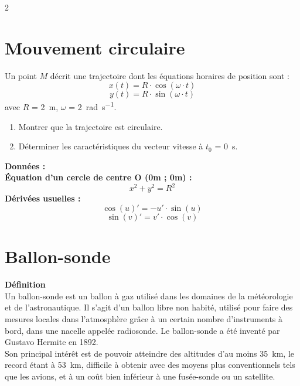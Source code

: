 \documentclass[a4paper,11pt,fleqn]{article}%
\begin{document}
\begin{multicols}{2}
\begin{center}
\end{center}
\section{Mouvement circulaire}
Un point $M$ décrit une trajectoire dont les équations horaires de position sont : $$x(t) = R \cdot \cos{(\omega \cdot t)}$$
$$y(t) = R \cdot \sin{(\omega \cdot t)}$$
avec $R$ = \SI{2}{m}, $\omega$ = \SI{2}{\radian\per\second}.
\begin{enumerate}
	\item Montrer que la trajectoire est circulaire.
	\item Déterminer les caractéristiques du vecteur vitesse à $t_0$ = \SI{0}{s}.
\end{enumerate}
\noindent \colorbox{red!10}{\begin{minipage}{.48\textwidth}
\textbf{Données : }\\
\textbf{Équation d'un cercle de centre O (0m ; 0m) : } $$x^2 + y^2 = R^2$$
\textbf{Dérivées usuelles :} $$\cos{(u)}' = -u'\cdot \sin{(u)}$$
$$\sin{(v)'} = v' \cdot \cos{(v)}$$
\end{minipage}}

\section{Ballon-sonde}
\noindent \colorbox{orange!10}{\begin{minipage}{.48\textwidth}
\textbf{Définition}\\
Un ballon-sonde est un ballon à gaz utilisé dans les domaines de la météorologie et de l'astronautique. Il s'agit d'un ballon libre non habité, utilisé pour faire des mesures locales dans l'atmosphère grâce à un certain nombre d'instruments à bord, dans une nacelle appelée radiosonde. Le ballon-sonde a été inventé par Gustavo Hermite en 1892.\\
Son principal intérêt est de pouvoir atteindre des altitudes d'au moins \SI{35}{km}, le record étant à \SI{53}{km}, difficile à obtenir avec des moyens plus conventionnels tels que les avions, et à un coût bien inférieur à une fusée-sonde ou un satellite.
\end{minipage}}


\end{multicols}
\end{document}
